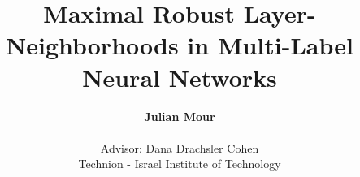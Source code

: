 \documentclass[11pt]{article}
\begin{document}
\title{Maximal Robust Layer-Neighborhoods in Multi-Label Neural Networks}

\author{
    \textbf{Julian Mour} \\
    \\
    Advisor: Dana Drachsler Cohen\\
    Technion - Israel Institute of Technology
}

\maketitle
















\end{document}

